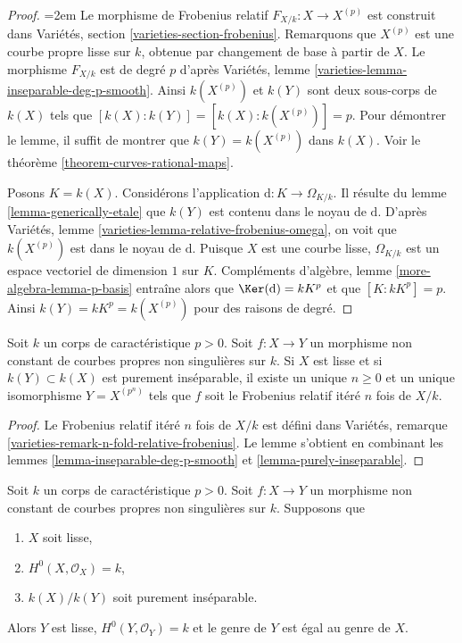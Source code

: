 \begin{proof}
{\emergencystretch=2em
Le morphisme de Frobenius relatif $F_{X/k} : X \to X^{(p)}$ est construit dans Variétés, section \ref{varieties-section-frobenius}. Remarquons que $X^{(p)}$ est une courbe propre lisse sur $k$, obtenue par changement de base à partir de $X$. Le morphisme $F_{X/k}$ est de degré $p$ d'après Variétés, lemme \ref{varieties-lemma-inseparable-deg-p-smooth}. Ainsi $k(X^{(p)})$ et $k(Y)$ sont deux sous-corps de $k(X)$ tels que $[k(X) : k(Y)] = [k(X) : k(X^{(p)})] = p$. Pour démontrer le lemme, il suffit de montrer que $k(Y) = k(X^{(p)})$ dans $k(X)$. Voir le théorème \ref{theorem-curves-rational-maps}.
\par}

\medskip\noindent
Posons $K = k(X)$. Considérons l'application $\text{d} : K \to \Omega_{K/k}$. Il résulte du lemme \ref{lemma-generically-etale} que $k(Y)$ est contenu dans le noyau de $\text{d}$. D'après Variétés, lemme \ref{varieties-lemma-relative-frobenius-omega}, on voit que $k(X^{(p)})$ est dans le noyau de $\text{d}$. Puisque $X$ est une courbe lisse, $\Omega_{K/k}$ est un espace vectoriel de dimension $1$ sur $K$. Compléments d'algèbre, lemme \ref{more-algebra-lemma-p-basis} entraîne alors que $\Ker(\text{d}) = kK^p$ et que $[K : kK^p] = p$. Ainsi $k(Y) = kK^p = k(X^{(p)})$ pour des raisons de degré.
\end{proof}

\begin{lemma}
\label{lemma-purely-inseparable-smooth}
Soit $k$ un corps de caractéristique $p > 0$. Soit $f : X \to Y$ un morphisme non constant de courbes propres non singulières sur $k$. Si $X$ est lisse et si $k(Y) \subset k(X)$ est purement inséparable, il existe un unique $n \geq 0$ et un unique isomorphisme $Y = X^{(p^n)}$ tels que $f$ soit le Frobenius relatif itéré $n$ fois de $X/k$.
\end{lemma}

\begin{proof}
Le Frobenius relatif itéré $n$ fois de $X/k$ est défini dans Variétés, remarque \ref{varieties-remark-n-fold-relative-frobenius}. Le lemme s'obtient en combinant les lemmes \ref{lemma-inseparable-deg-p-smooth} et \ref{lemma-purely-inseparable}.
\end{proof}

\begin{lemma}
\label{lemma-purely-inseparable-smooth-genus}
Soit $k$ un corps de caractéristique $p > 0$. Soit $f : X \to Y$ un morphisme non constant de courbes propres non singulières sur $k$. Supposons que \begin{enumerate} \item $X$ soit lisse, \item $H^0(X, \mathcal{O}_X) = k$, \item $k(X)/k(Y)$ soit purement inséparable. \end{enumerate} Alors $Y$ est lisse, $H^0(Y, \mathcal{O}_Y) = k$ et le genre de $Y$ est égal au genre de $X$.
\end{lemma}

